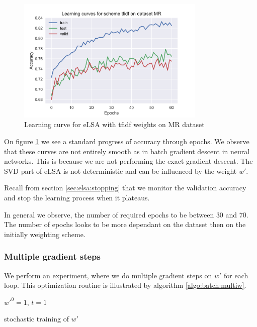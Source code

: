     \begin{figure}
    \centerline{\includegraphics[width=0.8\textwidth]{images/learning_curve_MR_tfidf}}
    \caption[Learning curve for eLSA with tfidf weights on MR dataset]{Learning curve for eLSA with tfidf weights on MR dataset}
    \label{img:learning:curve}
    \end{figure}

    On figure \ref{img:learning:curve} we see a standard progress of accuracy through epochs. 
    We observe that these curves are not entirely smooth as in batch gradient descent in neural networks.
    This is because we are not performing the exact gradient descent.
    The SVD part of eLSA is not deterministic and can be influenced by the weight $w'$.
    
    Recall from section \ref{sec:elsa:stopping} that we monitor the validation accuracy and stop the learning process when it plateaus. 
    
    In general we observe, the number of required epochs to be between $30$ and $70$. 
    The number of epochs looks to be more dependant on the dataset then on the initially weighting scheme.
    
    
    \subsubsection{Multiple gradient steps}
    
    We perform an experiment, where we do multiple gradient steps on $w'$ for each loop. 
    This optimization routine is illustrated by algorithm \ref{algo:batch:multiw}.
    
    \begin{algorithm}[H]
        $w'^0 = 1$, $t=1$\;
        \caption{stochastic training of $w'$} \label{algo:batch:multiw}
    \end{algorithm}
    
